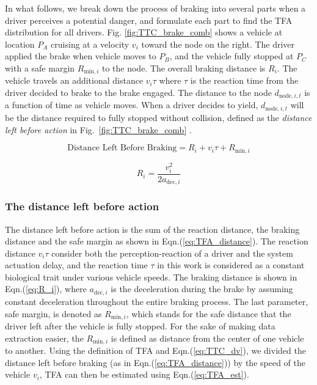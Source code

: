 In what follows, we break down the process of braking into several parts when a driver perceives a potential danger, and formulate each part to find the TFA distribution for all drivers. Fig. \ref{fig:TTC_brake_comb} shows a vehicle at location $P_A$ cruising at a velocity $v_i$ toward the node on the right. The driver applied the brake when vehicle moves to $P_B$, and the vehicle fully stopped at $P_C$ with a safe margin $R_{\mathrm{min},i}$ to the node. The overall braking distance is $R_i$. The vehicle travels an additional distance $v_i\tau$ where $\tau$ is the reaction time from the driver decided to brake to the brake engaged. The distance to the node $d_{\mathrm{node},i, t}$ is a function of time as vehicle moves. When a driver decides to yield, $d_{\mathrm{node},i, t}$ will be the distance required to fully stopped without collision, defined as the \textit{distance left before action} in Fig.~\ref{fig:TTC_brake_comb} .


\begin{equation}
\text{Distance Left Before Braking} = R_i+v_i\tau+R_{\mathrm{min},i}
\label{eq:TFA_distance}
\end{equation}

\begin{equation}
R_{i} = \frac{v_i^2}{2a_{\mathrm{dec},i}}
\label{eq:R_i}
\end{equation}

\subsubsection{The distance left before action}
The distance left before action is the sum of the reaction distance, the braking distance and the safe margin as shown in Eqn.(\ref{eq:TFA_distance}). The reaction distance $v_i \tau$ consider both the perception-reaction of a driver and the system actuation delay, and the reaction time $\tau$ in this work is considered as a constant biological trait under various vehicle speeds. The braking distance is shown in Eqn.(\ref{eq:R_i}), where $a_{\mathrm{dec},i}$ is the deceleration during the brake by assuming constant deceleration throughout the entire braking process. The last parameter, safe margin, is denoted as $R_{\mathrm{min},i}$, which stands for the safe distance that the driver left after the vehicle is fully stopped. For the sake of making data extraction easier, the $R_{\mathrm{min},i}$ is defined as distance from the center of one vehicle to another. Using the definition of TFA and Eqn.(\ref{eq:TTC_dv}), we divided the distance left before braking (as in Eqn.(\ref{eq:TFA_distance})) by the speed of the vehicle ${v_i}$, TFA can then be estimated using Eqn.(\ref{eq:TFA_est}).

